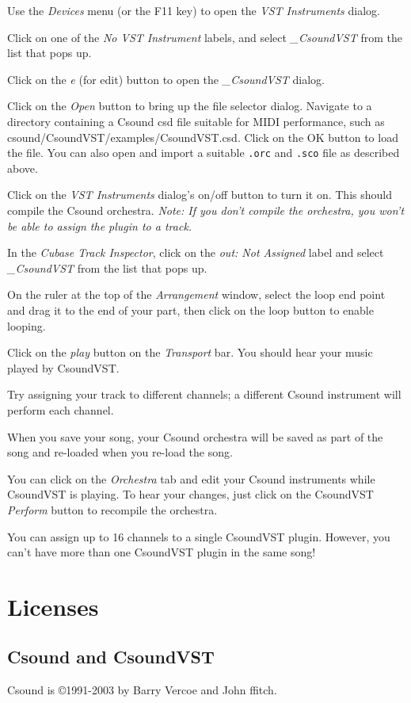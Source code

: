 \documentclass[10pt,letterpaper,onecolumn]{ltxguide}
\begin{document}
Use the \emph{Devices} menu (or the F11 key) to open the \emph{VST Instruments} dialog. 

Click on one of the \emph{No VST Instrument} labels, and select \emph{\_CsoundVST} from the list that pops up. 

Click on the \emph{e} (for edit) button to open the \emph{\_CsoundVST} dialog. 

Click on the \emph{Open} button to bring up the file selector dialog. Navigate to a directory containing a Csound csd file suitable for MIDI performance, such as csound/CsoundVST/examples/CsoundVST.csd. Click on the OK button to load the file. You can also open and import a suitable \texttt{.orc} and \texttt{.sco} file as described above. 

Click on the \emph{VST Instruments} dialog's on/off button to turn it on. This should compile the Csound orchestra. \emph{Note: If you don't compile the orchestra, you won't be able to assign the plugin to a track.} 

In the \emph{Cubase Track Inspector}, click on the \emph{out: Not Assigned} label and select \emph{\_CsoundVST} from the list that pops up. 

On the ruler at the top of the \emph{Arrangement} window, select the loop end point and drag it to the end of your part, then click on the loop button to enable looping. 

Click on the \emph{play} button on the \emph{Transport} bar. You should hear your music played by CsoundVST. 

Try assigning your track to different channels; a different Csound instrument will perform each channel. 

When you save your song, your Csound orchestra will be saved as part of the song and re-loaded when you re-load the song. 

You can click on the \emph{Orchestra} tab and edit your Csound instruments while CsoundVST is playing. To hear your changes, just click on the CsoundVST \emph{Perform} button to recompile the orchestra. 

You can assign up to 16 channels to a single CsoundVST plugin. However, you can't have more than one CsoundVST plugin in the same song! 
\section{Licenses}
\subsection{Csound and CsoundVST}
Csound is \copyright 1991-2003 by Barry Vercoe and John ffitch.
\end{document}
